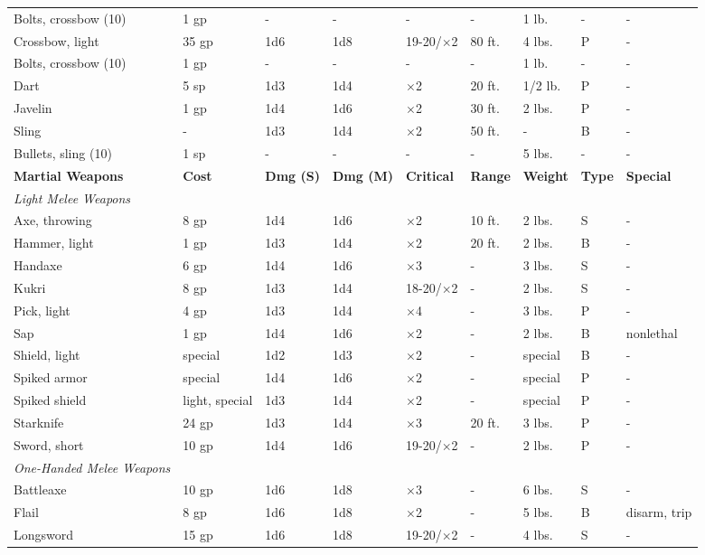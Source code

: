 \begin{table*}[]
\begin{tabular}{lllllllll}
 Bolts, crossbow (10) & 1 gp & - & - & - & - & 1 lb. & - & - \\
 Crossbow, light & 35 gp & 1d6 & 1d8 & 19-20/$\times$2 & 80 ft. & 4 lbs. & P & - \\
 Bolts, crossbow (10) & 1 gp & - & - & - & - & 1 lb. & - & - \\
 Dart & 5 sp & 1d3 & 1d4 & $\times$2 & 20 ft. & 1/2 lb. & P & - \\
 Javelin & 1 gp & 1d4 & 1d6 & $\times$2 & 30 ft. & 2 lbs. & P & - \\
 Sling & - & 1d3 & 1d4 & $\times$2 & 50 ft. & - & B & - \\
 Bullets, sling (10) & 1 sp & - & - & - & - & 5 lbs. & - & -\\
\textbf{Martial Weapons} & \textbf{Cost} & \textbf{Dmg (S)} & \textbf{Dmg (M)} & \textbf{Critical} & \textbf{Range} & \textbf{Weight} & \textbf{Type} & \textbf{Special}\\
\textit{Light Melee Weapons} \\
 Axe, throwing & 8 gp & 1d4 & 1d6 & $\times$2 & 10 ft. & 2 lbs. & S & - \\
 Hammer, light & 1 gp & 1d3 & 1d4 & $\times$2 & 20 ft. & 2 lbs. & B & - \\
 Handaxe & 6 gp & 1d4 & 1d6 & $\times$3 & - & 3 lbs. & S & - \\
 Kukri & 8 gp & 1d3 & 1d4 & 18-20/$\times$2 & - & 2 lbs. & S & - \\
 Pick, light & 4 gp & 1d3 & 1d4 & $\times$4 & - & 3 lbs. & P & - \\
 Sap & 1 gp & 1d4 & 1d6 & $\times$2 & - & 2 lbs. & B & nonlethal \\
 Shield, light & special & 1d2 & 1d3 & $\times$2 & - & special & B & - \\
 Spiked armor & special & 1d4 & 1d6 & $\times$2 & - & special & P & - \\
 Spiked shield & light, special & 1d3 & 1d4 & $\times$2 & - & special & P & - \\
 Starknife & 24 gp & 1d3 & 1d4 & $\times$3 & 20 ft. & 3 lbs. & P & - \\
 Sword, short & 10 gp & 1d4 & 1d6 & 19-20/$\times$2 & - & 2 lbs. & P & - \\
 \textit{One-Handed Melee Weapons} \\
 Battleaxe & 10 gp & 1d6 & 1d8 & $\times$3 & - & 6 lbs. & S & - \\
 Flail & 8 gp & 1d6 & 1d8 & $\times$2 & - & 5 lbs. & B & disarm, trip \\
 Longsword & 15 gp & 1d6 & 1d8 & 19-20/$\times$2 & - & 4 lbs. & S & - \\

\end{tabular}
\end{table*}
